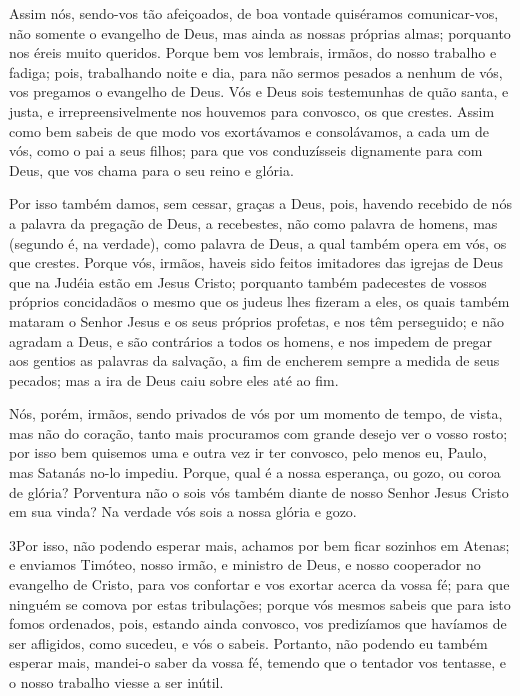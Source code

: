 Assim nós, sendo-vos tão afeiçoados, de boa vontade quiséramos
comunicar-vos, não somente o evangelho de Deus, mas ainda as nossas
próprias almas; porquanto nos éreis muito queridos. Porque bem
vos lembrais, irmãos, do nosso trabalho e fadiga; pois, trabalhando
noite e dia, para não sermos pesados a nenhum de vós, vos pregamos o
evangelho de Deus. Vós e Deus sois testemunhas de quão santa,
e justa, e irrepreensivelmente nos houvemos para convosco, os que
crestes. Assim como bem sabeis de que modo vos exortávamos e
consolávamos, a cada um de vós, como o pai a seus filhos;
para que vos conduzísseis dignamente para com Deus, que vos
chama para o seu reino e glória.

Por isso também damos, sem cessar, graças a Deus, pois, havendo
recebido de nós a palavra da pregação de Deus, a recebestes, não
como palavra de homens, mas (segundo é, na verdade), como palavra de
Deus, a qual também opera em vós, os que crestes. Porque vós,
irmãos, haveis sido feitos imitadores das igrejas de Deus que na
Judéia estão em Jesus Cristo; porquanto também padecestes de vossos
próprios concidadãos o mesmo que os judeus lhes fizeram a eles,
os quais também mataram o Senhor Jesus e os seus próprios
profetas, e nos têm perseguido; e não agradam a Deus, e são
contrários a todos os homens, e nos impedem de pregar aos
gentios as palavras da salvação, a fim de encherem sempre a medida
de seus pecados; mas a ira de Deus caiu sobre eles até ao fim.

Nós, porém, irmãos, sendo privados de vós por um momento de
tempo, de vista, mas não do coração, tanto mais procuramos com
grande desejo ver o vosso rosto; por isso bem quisemos uma e
outra vez ir ter convosco, pelo menos eu, Paulo, mas Satanás no-lo
impediu. Porque, qual é a nossa esperança, ou gozo, ou coroa
de glória? Porventura não o sois vós também diante de nosso Senhor
Jesus Cristo em sua vinda? Na verdade vós sois a nossa glória
e gozo.

\medskip

\lettrine{3} Por isso, não podendo esperar mais, achamos por
bem ficar sozinhos em Atenas; e enviamos Timóteo, nosso irmão, e
ministro de Deus, e nosso cooperador no evangelho de Cristo, para
vos confortar e vos exortar acerca da vossa fé; para que ninguém
se comova por estas tribulações; porque vós mesmos sabeis que para
isto fomos ordenados, pois, estando ainda convosco, vos
predizíamos que havíamos de ser afligidos, como sucedeu, e vós o
sabeis. Portanto, não podendo eu também esperar mais, mandei-o
saber da vossa fé, temendo que o tentador vos tentasse, e o nosso
trabalho viesse a ser inútil.

